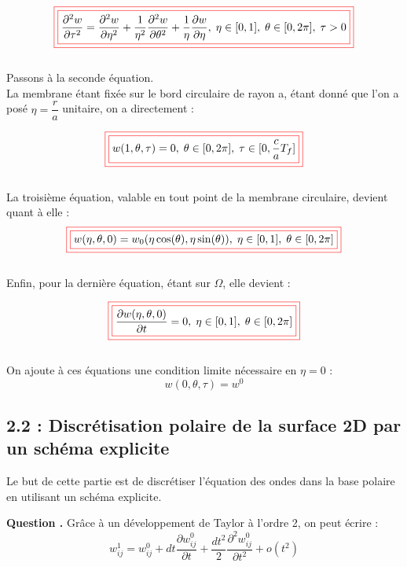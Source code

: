 \documentclass[a4,12pt]{article}
\newcommand{\redbox}[1]{\fcolorbox{red}{white}{\fcolorbox{red}{white}{$\displaystyle#1$}}}
\newcounter{Nbquestion}
\newcommand*\question{%
  \stepcounter{Nbquestion}%
  \textbf{Question \theNbquestion. }}
\begin{document}
\begin{itemize}
			      \[\redbox{
				\dfrac{\partial^2 w}{\partial \tau^2} = \dfrac{\partial^2 w}{\partial \eta^2}+\dfrac{1}{\eta^2}\dfrac{\partial^2 w}{\partial \theta^2}+\dfrac{1}{\eta}\dfrac{\partial w}{\partial \eta},\;\eta\in[0,1],\;\theta\in[0,2\pi],\;\tau>0
			      }\]
			      ~\\

			      Passons à la seconde équation.\\

			      La membrane étant fixée sur le bord circulaire de rayon a, étant donné que l'on a posé $\eta=\dfrac{r}{a}$ unitaire, on a directement :

			      \[\redbox{
				w(1,\theta,\tau) = 0,\;\theta\in[0,2\pi],\;\tau\in[0,\frac{c}{a}T_f]
			      }\]
			      ~\\
			      La troisième équation, valable en tout point de la membrane circulaire, devient quant à elle :\\
			      \[\redbox{
				w(\eta,\theta,0) = w_0(\eta \cos(\theta),\eta \sin (\theta)),\;\eta\in[0,1],\;\theta\in[0,2\pi]
			      }\]
			      ~\\

			      Enfin, pour la dernière équation, étant sur $\Omega$, elle devient :

			      \[\redbox{
				\dfrac{\partial w(\eta,\theta,0)}{\partial t} = 0,\;\eta\in[0,1],\;\theta\in[0,2\pi]
			      }\]
			      ~\\
			      On ajoute à ces équations une condition limite nécessaire  en $\eta=0$ :
			      \[
				w(0,\theta,\tau)=w^0
			      \]

			  \end{itemize}


			  \subsection*{2.2 : Discrétisation polaire de la surface 2D par un schéma explicite }
			  Le but de cette partie est de discrétiser l'équation des ondes dans la base polaire en utilisant un schéma explicite.


			      \question Grâce à un développement de Taylor à
			      l'ordre 2, on
			      peut écrire :
			      \[
				w_{ij}^1 = w_{ij}^0 + dt\frac{\partial w_{ij}^0}{\partial t} + \frac{dt^2}{2}\frac{\partial^2 w_{ij}^0}{\partial t^2} + o(t^2)
			      \]
\end{document}
